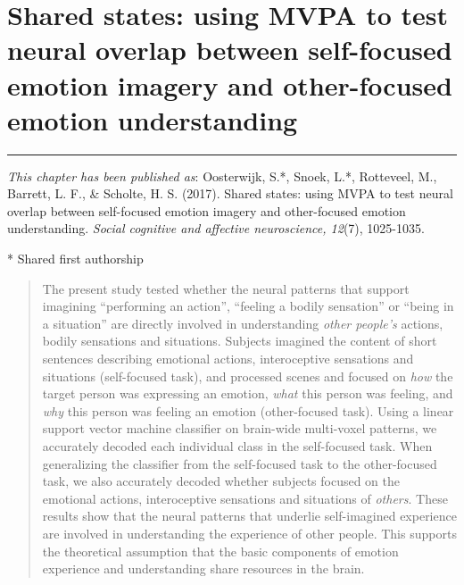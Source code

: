 \documentclass[11pt,american,]{memoir} %
\begin{document}
\hypertarget{shared-states}{%
\chapter{Shared states: using MVPA to test neural overlap between self-focused emotion imagery and other-focused emotion understanding}\label{shared-states}}


\vspace*{\fill}

\begin{center}\rule{0.5\linewidth}{0.5pt}\end{center}

\small

\noindent
\emph{This chapter has been published as}: Oosterwijk, S.*, Snoek, L.*, Rotteveel, M., Barrett, L. F., \& Scholte, H. S. (2017). Shared states: using MVPA to test neural overlap between self-focused emotion imagery and other-focused emotion understanding. \emph{Social cognitive and affective neuroscience, 12}(7), 1025-1035.

* Shared first authorship
\newpage
\normalsize

\begin{abstract}
The present study tested whether the neural patterns that support imagining ``performing an action'', ``feeling a bodily sensation'' or ``being in a situation'' are directly involved in understanding \emph{other people's} actions, bodily sensations and situations. Subjects imagined the content of short sentences describing emotional actions, interoceptive sensations and situations (self-focused task), and processed scenes and focused on \emph{how} the target person was expressing an emotion, \emph{what} this person was feeling, and \emph{why} this person was feeling an emotion (other-focused task). Using a linear support vector machine classifier on brain-wide multi-voxel patterns, we accurately decoded each individual class in the self-focused task. When generalizing the classifier from the self-focused task to the other-focused task, we also accurately decoded whether subjects focused on the emotional actions, interoceptive sensations and situations of \emph{others}. These results show that the neural patterns that underlie self-imagined experience are involved in understanding the experience of other people. This supports the theoretical assumption that the basic components of emotion experience and understanding share resources in the brain.
\end{abstract} \newpage
\end{document}

